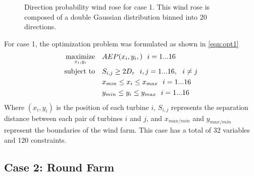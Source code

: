\documentclass[a4paper]{jpconf}
\begin{document}
\begin{figure}[h!]
\begin{minipage}[t]{18pc}
\caption{Direction probability wind rose for case 1. This wind rose is composed of a double Gaussian distribution binned into 20 directions.}
\label{fig:directional}
\end{minipage} 
\end{figure}
%

For case 1, the optimization problem was formulated as shown in \cref{eqn:opt1}
%
\begin{equation}
	\label{eqn:opt1}
	\begin{aligned} [b]
	\underset{x_i,y_i}{\textrm{maximize}} \quad & AEP(x_i,y_i,)~~i=1...16\\
	\textrm{subject to} \quad & S_{i,j} \geq 2\*D_{r}~~i,j=1...16,~~i \neq j\\
	 & x_{min} \leq x_i \leq x_{max}~~i=1...16\\
     & y_{min} \leq y_i \leq y_{max}~~i=1...16
	\end{aligned}
\end{equation}
%
Where $(x_i,y_i)$ is the position of each turbine $i$, $S_{i,j}$ represents the separation distance between each pair of turbines $i$ and $j$, and $x_{max/min}$ and $y_{max/min}$ represent the boundaries of the wind farm. This case has a total of 32 variables and 120 constraints.

\subsection{Case 2: Round Farm}
\end{document}
